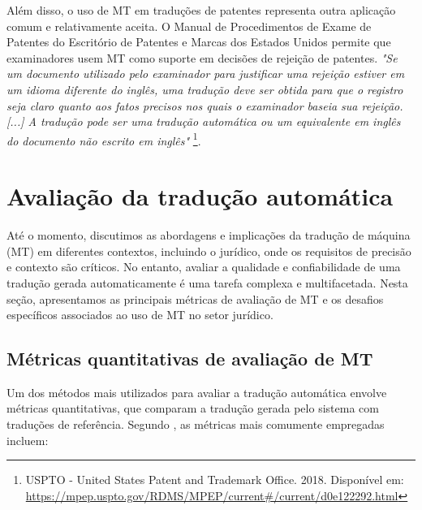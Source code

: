Além disso, o uso de MT em traduções de patentes representa outra aplicação comum e relativamente aceita. O Manual de Procedimentos de Exame de Patentes do Escritório de Patentes e Marcas dos Estados Unidos permite que examinadores usem MT como suporte em decisões de rejeição de patentes. \textit{"Se um documento utilizado pelo examinador para justificar uma rejeição estiver em um idioma diferente do inglês, uma tradução deve ser obtida para que o registro seja claro quanto aos fatos precisos nos quais o examinador baseia sua rejeição. [...] A tradução pode ser uma tradução automática ou um equivalente em inglês do documento não escrito em inglês"} \footnote{USPTO - United States Patent and Trademark Office. 2018. Disponível em: \url{https://mpep.uspto.gov/RDMS/MPEP/current\#/current/d0e122292.html}}.


\section{Avaliação da tradução automática}

Até o momento, discutimos as abordagens e implicações da tradução de máquina (MT) em diferentes contextos, incluindo o jurídico, onde os requisitos de precisão e contexto são críticos. No entanto, avaliar a qualidade e confiabilidade de uma tradução gerada automaticamente é uma tarefa complexa e multifacetada. Nesta seção, apresentamos as principais métricas de avaliação de MT e os desafios específicos associados ao uso de MT no setor jurídico.

\subsection{\textbf{Métricas quantitativas de avaliação de MT}}
Um dos métodos mais utilizados para avaliar a tradução automática envolve métricas quantitativas, que comparam a tradução gerada pelo sistema com traduções de referência. Segundo , as métricas mais comumente empregadas incluem:

